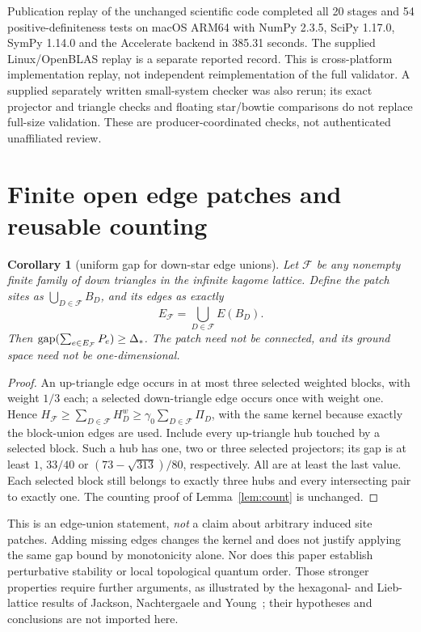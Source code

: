 \documentclass[11pt,a4paper]{article}
\newtheorem{corollary}[theorem]{Corollary}
\theoremstyle{remark}\newtheorem{remark}[theorem]{Remark}
\newcommand{\gap}{\operatorname{gap}}\newcommand{\ran}{\operatorname{ran}}
\begin{document}
Publication replay of the unchanged scientific code completed all 20 stages and 54 positive-definiteness tests on macOS ARM64 with NumPy 2.3.5, SciPy 1.17.0, SymPy 1.14.0 and the Accelerate backend in 385.31 seconds. The supplied Linux/OpenBLAS replay is a separate reported record. This is cross-platform implementation replay, not independent reimplementation of the full validator. A supplied separately written small-system checker was also rerun; its exact projector and triangle checks and floating star/bowtie comparisons do not replace full-size validation. These are producer-coordinated checks, not authenticated unaffiliated review.

\section{Finite open edge patches and reusable counting}\label{sec:patch}
\begin{corollary}[uniform gap for down-star edge unions]\label{cor:patch}
Let $\mathcal F$ be any nonempty finite family of down triangles in the infinite kagome lattice. Define the patch sites as $\bigcup_{D\in\mathcal F}B_D$, and its edges as exactly
\[
 E_{\mathcal F}=\bigcup_{D\in\mathcal F}E(B_D).
\]
Then $\gap(\sum_{e\in E_{\mathcal F}}P_e)\ge\Dstar$. The patch need not be connected, and its ground space need not be one-dimensional.
\end{corollary}
\begin{proof}
An up-triangle edge occurs in at most three selected weighted blocks, with weight $1/3$ each; a selected down-triangle edge occurs once with weight one. Hence $H_{\mathcal F}\ge\sum_{D\in\mathcal F}H_D^w\ge\gamma_0\sum_{D\in\mathcal F}\Pi_D$, with the same kernel because exactly the block-union edges are used. Include every up-triangle hub touched by a selected block. Such a hub has one, two or three selected projectors; its gap is at least $1$, $33/40$ or $(73-\sqrt{313})/80$, respectively. All are at least the last value. Each selected block still belongs to exactly three hubs and every intersecting pair to exactly one. The counting proof of Lemma~\ref{lem:count} is unchanged.
\end{proof}
This is an edge-union statement, \emph{not} a claim about arbitrary induced site patches. Adding missing edges changes the kernel and does not justify applying the same gap bound by monotonicity alone. Nor does this paper establish perturbative stability or local topological quantum order. Those stronger properties require further arguments, as illustrated by the hexagonal- and Lieb-lattice results of Jackson, Nachtergaele and Young~\cite{JNY}; their hypotheses and conclusions are not imported here.
\end{document}
